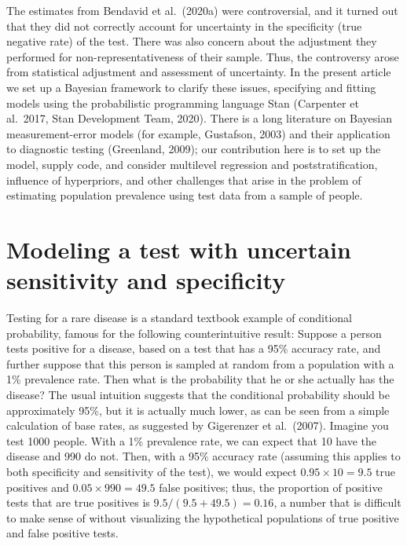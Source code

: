 \documentclass[11pt]{article}
\begin{document}
The estimates from Bendavid et al.\ (2020a) were controversial, and it turned out that they did not correctly account for uncertainty in the specificity (true negative rate) of the test.  There was also concern about the adjustment they performed for non-representativeness of their sample.  Thus, the controversy arose from statistical adjustment and assessment of uncertainty.  In the present article we set up a Bayesian framework to clarify these issues, specifying and fitting models using the probabilistic programming language Stan (Carpenter et al.\ 2017, Stan Development Team, 2020).  There is a long literature on Bayesian measurement-error models (for example, Gustafson, 2003) and their application to diagnostic testing (Greenland, 2009); our contribution here is to set up the model, supply code, and consider multilevel regression and poststratification, influence of hyperpriors, and other challenges that arise in the problem of estimating population prevalence using test data from a sample of people.


\section{Modeling a test with uncertain sensitivity and specificity}\label{model1}

Testing for a rare disease is a standard textbook example of conditional probability, famous for the following counterintuitive result:  Suppose a person tests positive for a disease, based on a test that has a 95\% accuracy rate, and further suppose that this person is sampled at random from a population with a 1\% prevalence rate.  Then what is the probability that he or she actually has the disease? The usual intuition suggests that the conditional probability should be approximately 95\%, but it is actually much lower, as can be seen from a simple calculation of base rates, as suggested by Gigerenzer et al.\ (2007).  Imagine you test 1000 people.  With a 1\% prevalence rate, we can expect that 10 have the disease and 990 do not.  Then, with a 95\% accuracy rate (assuming this applies to both specificity and sensitivity of the test), we would expect $0.95 \times 10=9.5$ true positives and $0.05 \times 990 =  49.5$ false positives; thus, the proportion of positive tests that are true positives is $9.5/(9.5+49.5) = 0.16$, a number that is difficult to make sense of without visualizing the hypothetical populations of true positive and false positive tests.
\end{document}
